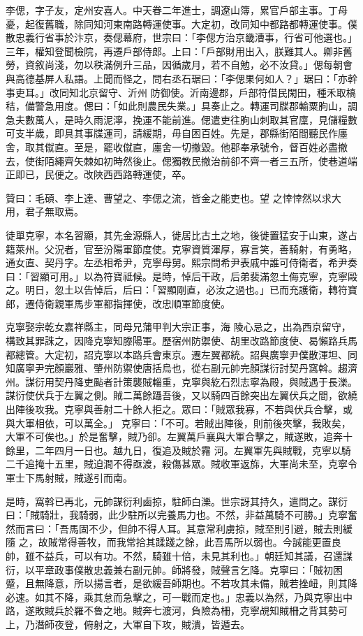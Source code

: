 \begin{pinyinscope}
 李偲，字子友，定州安喜人。中天眷二年進士，調遼山簿，累官戶部主事。丁母憂，起復舊職，除同知河東南路轉運使事。大定初，改同知中都路都轉運使事。僕散忠義行省事於汴京，奏偲幕府，世宗曰：「李偲方治京畿漕事，行省可他選也。」三年，權知登聞檢院，再遷戶部侍郎。上曰：「戶部財用出入，朕難其人。卿非舊勞，資敘尚淺，勿以秩滿例升三品，因循歲月，若不自勉，必不汝貸。」偲每朝會與高德基屏人私語。上聞而怪之，問右丞石琚曰：「李偲果何如人？」琚曰：「亦幹事吏耳。」改同知北京留守、沂州
 防御使。沂南邊郡，戶部符借民閑田，種禾取槁秸，備警急用度。偲曰：「如此則農民失業。」具奏止之。轉運司牒郡輸粟朐山，調急夫數萬人，是時久雨泥濘，挽運不能前進。偲遣吏往朐山刺取其官廩，見儲糧數可支半歲，即具其事牒運司，請緩期，毋自困百姓。先是，郡縣街陌間聽民作廛舍，取其僦直。至是，罷收僦直，廛舍一切撤毀。他郡奉承號令，督百姓必盡撤去，使街陌繩齊矢棘如初時然後止。偲獨教民撤治前卻不齊一者三五所，使巷道端正即已，民便之。改陜西西路轉運使，卒。



 贊曰：毛碩、李上達、曹望之、李偲之流，皆金之能吏也。望
 之悻悻然以求大用，君子無取焉。



 徒單克寧，本名習顯，其先金源縣人，徙居比古土之地，後徙置猛安于山東，遂占籍萊州。父況者，官至汾陽軍節度使。克寧資質渾厚，寡言笑，善騎射，有勇略，通女直、契丹字。左丞相希尹，克寧母舅。熙宗問希尹表戚中誰可侍衛者，希尹奏曰：「習顯可用。」以為符寶祗候。是時，悼后干政，后弟裴滿忽土侮克寧，克寧毆之。明日，忽土以告悼后，后曰：「習顯剛直，必汝之過也。」已而充護衛，轉符寶郎，遷侍衛親軍馬步軍都指揮使，改忠順軍節度使。


克寧娶宗乾女嘉祥縣主，同母兄蒲甲判大宗正事，海
 陵心忌之，出為西京留守，構致其罪誅之，因降克寧知滕陽軍。歷宿州防禦使、胡里改路節度使、曷懶路兵馬都總管。大定初，詔克寧以本路兵會東京。遷左翼都統。詔與廣寧尹僕散渾坦、同知廣寧尹完顏巖雅、肇州防禦使唐括烏也，從右副元帥完顏謀衍討契丹窩斡。趨濟州。謀衍用契丹降吏颭者計策襲賊輜重，克寧與紇石烈志寧為殿，與賊遇于長濼。謀衍使伏兵于左翼之側。賊二萬餘躡吾後，又以騎四百餘突出左翼伏兵之間，欲繞出陣後攻我。克寧與善射二十餘人拒之。眾曰：「賊眾我寡，不若與伏兵合擊，或與大軍相依，可以萬全。」
 克寧曰：「不可。若賊出陣後，則前後夾擊，我敗矣，大軍不可俟也。」於是奮擊，賊乃卻。左翼萬戶襄與大軍合擊之，賊遂敗，追奔十餘里，二年四月一日也。越九日，復追及賊於霿
 河。左翼軍先與賊戰，克寧以騎二千追掩十五里，賊迫澗不得亟渡，殺傷甚眾。賊收軍返旆，大軍尚未至，克寧令軍士下馬射賊，賊遂引而南。



 是時，窩斡已再北，元帥謀衍利鹵掠，駐師白濼。世宗訝其持久，遣問之。謀衍曰：「賊騎壯，我騎弱，此少駐所以完養馬力也。不然，非益萬騎不可勝。」克寧奮然而言曰：「吾馬固不少，但帥不得人耳。其意常利虜掠，賊至則引避，賊去則緩隨
 之，故賊常得善牧，而我常拾其蹂踐之餘，此吾馬所以弱也。今誠能更置良帥，雖不益兵，可以有功。不然，騎雖十倍，未見其利也。」朝廷知其議，召還謀衍，以平章政事僕散忠義兼右副元帥。師將發，賊聲言乞降。克寧曰：「賊初困蹙，且無降意，所以揚言者，是欲緩吾師期也。不若攻其未備，賊若挫衄，則其降必速。如其不降，乘其怠而急擊之，可一戰而定也。」忠義以為然，乃與克寧出中路，遂敗賊兵於羅不魯之地。賊奔七渡河，負險為柵，克寧覘知賊柵之背其勢可上，乃潛師夜登，俯射之，大軍自下攻，賊潰，皆遁去。




\end{pinyinscope}

